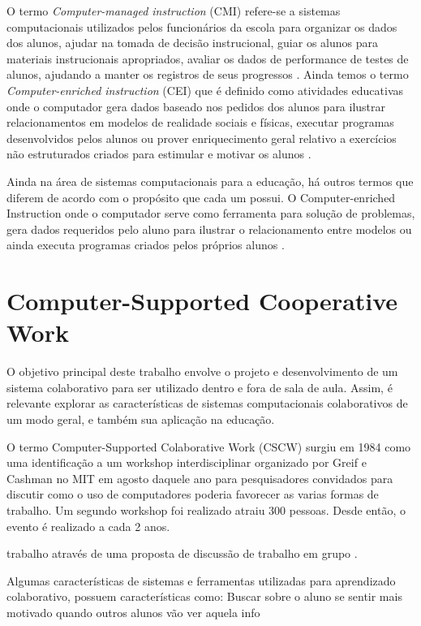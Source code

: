 O termo \emph{Computer-managed instruction} (CMI) refere-se a sistemas computacionais utilizados pelos funcionários da escola para organizar os dados dos alunos, ajudar na tomada de decisão instrucional, guiar os alunos para materiais instrucionais apropriados, avaliar os dados de performance de testes de alunos, ajudando a manter os registros de seus progressos \cite{cotton91, wheres98}. Ainda temos o termo \emph{Computer-enriched instruction} (CEI) que é definido como atividades educativas onde o computador gera dados baseado nos pedidos dos alunos para ilustrar relacionamentos em modelos de realidade sociais e físicas, executar programas desenvolvidos pelos alunos ou prover enriquecimento geral relativo a exercícios não estruturados criados para estimular e motivar os alunos \cite{cotton91}.

Ainda na área de sistemas computacionais para a educação, há outros termos que diferem de acordo com o propósito que cada um possui. O Computer-enriched Instruction onde o computador serve como ferramenta para solução de problemas, gera dados requeridos pelo aluno para ilustrar o relacionamento entre modelos ou ainda executa programas criados pelos próprios alunos \cite{wheres98, cotton91}.


\section{Computer-Supported Cooperative Work}

O objetivo principal deste trabalho envolve o projeto e desenvolvimento de um sistema colaborativo para ser utilizado dentro e fora de sala de aula. Assim, é relevante explorar as características de sistemas computacionais colaborativos de um modo geral, e também sua aplicação na educação.

O termo Computer-Supported Colaborative Work (CSCW) surgiu em 1984 como uma identificação a um workshop interdisciplinar organizado por Greif e Cashman no MIT em agosto daquele ano para pesquisadores convidados para discutir como o uso de computadores poderia favorecer as varias formas de trabalho. Um segundo workshop foi realizado atraiu 300 pessoas. Desde então, o evento é realizado a cada 2 anos.

 trabalho através de uma proposta de discussão de trabalho em grupo \cite{greif1988}.


Algumas características de sistemas e ferramentas utilizadas para aprendizado colaborativo, possuem características como:
Buscar sobre o aluno se sentir mais motivado quando outros alunos vão ver aquela info

